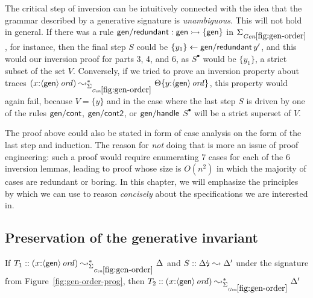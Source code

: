 The critical step of inversion can be intuitively connected with the
idea that the grammar described by a generative signature is {\it
  unambiguous}. This will not hold in general. If there was
a rule ${\sf gen/redundant} : {\sf gen} \rightarrowtail \{ {\sf gen} \}$ in
$\Sigma_{\it Gen\ref{fig:gen-order}}$, for instance, then the final
step $S$ could be
$\{{y_1}\} \leftarrow {{\sf gen/redundant}\,y'}$, and this would our
inversion proof
for parts 3, 4, and 6, as $S^{\bullet}$ would be $\{y_1\}$, a strict
subset of the set $V$. 
Conversely, if we tried to prove an inversion
property about traces $(x{:}\istrue{\susp{\sf gen}})
\leadsto^*_{\siggenorder} \tackon{\Theta}{y{:}\istrue{\susp{{\sf
        gen}}}}$, this property would again fail, because $V = \{ y
\}$ and in the case where the last step $S$ is driven by one of the
rules ${\sf gen/cont}$, ${\sf gen/cont2}$, or ${\sf gen/handle}$
$S^{\bullet}$ will be a strict superset of $V$.

The proof above could also be stated in form of case analysis on the
form of the last step and induction. The reason for {\it not} doing
that is more an issue of proof engineering: such a proof would require
enumerating 7 cases for each of the 6 inversion lemmas, leading to
proof whose size is $O(n^2)$ in which the majority of cases are
redundant or boring. In this chapter, we will emphasize the principles
by which we can use to reason {\it concisely} about the specifications
we are interested in.

\subsection{Preservation of the generative invariant}

\begin{theorem}\label{thm:siggenorder}
If $T_1 :: (x{:}\istrue{\susp{\sf gen}}) \leadsto^*_{\siggenorder} 
   \Delta$ and $S :: {\Delta}{\mbox{\lightning}}_{} \leadsto \Delta'$
under the signature from Figure~\ref{fig:gen-order-prog}, then
$T_2 :: (x{:}\istrue{\susp{\sf gen}}) \leadsto^*_{\siggenorder} 
   \Delta'$
\end{theorem}

